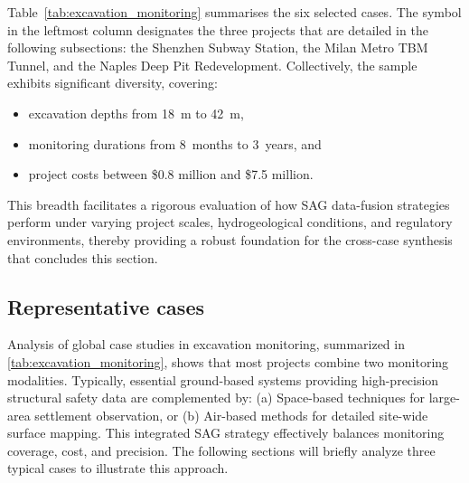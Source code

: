 \documentclass[preprint,11pt,authoryear,3p]{elsarticle}
\begin{document}
Table~\ref{tab:excavation_monitoring} summarises the six selected cases. The symbol  in the leftmost column designates the three projects that are detailed in the following subsections: the Shenzhen Subway Station, the Milan Metro TBM Tunnel, and the Naples Deep Pit Redevelopment. Collectively, the sample exhibits significant diversity, covering:

\begin{itemize}
\item excavation depths from 18~m to 42~m,
\item monitoring durations from 8~months to 3~years, and
\item project costs between \$0.8 million and \$7.5 million.
\end{itemize}

This breadth facilitates a rigorous evaluation of how SAG data-fusion strategies perform under varying project scales, hydrogeological conditions, and regulatory environments, thereby providing a robust foundation for the cross-case synthesis that concludes this section.

\subsection{Representative cases}

Analysis of global case studies in excavation monitoring, summarized in \autoref{tab:excavation_monitoring}, shows that most projects combine two monitoring modalities. Typically, essential ground-based systems providing high-precision structural safety data are complemented by: (a) Space-based techniques for large-area settlement observation, or (b) Air-based methods for detailed site-wide surface mapping. This integrated SAG strategy effectively balances monitoring coverage, cost, and precision. The following sections will briefly analyze three typical cases to illustrate this approach.
\end{document}
